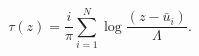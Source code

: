 \begin{equation}
\tau(z)=\frac{i}{\pi}\sum_{i=1}^{N} \log \frac{(z-\bar{u}_i)}{\Lambda}.
\label{run2}
\end{equation}

